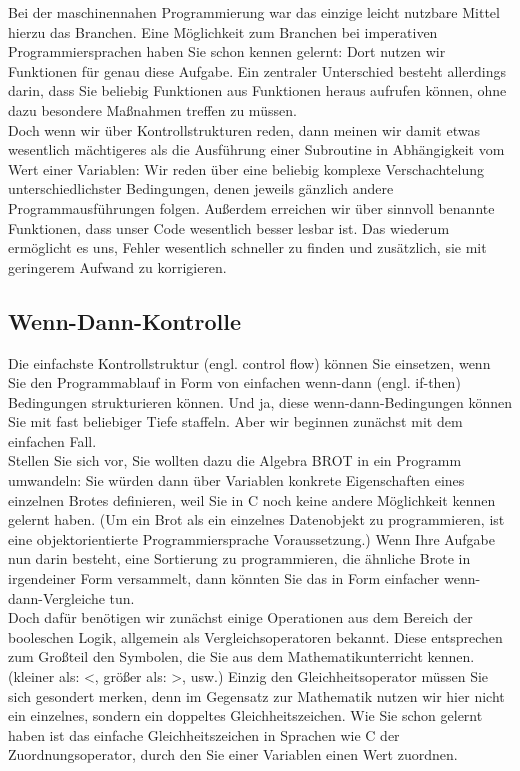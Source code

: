 Bei der maschinennahen Programmierung war das einzige leicht nutzbare Mittel hierzu das Branchen. Eine Möglichkeit zum Branchen bei imperativen Programmiersprachen haben Sie schon kennen gelernt: Dort nutzen wir Funktionen für genau diese Aufgabe. Ein zentraler Unterschied besteht allerdings darin, dass Sie beliebig Funktionen aus Funktionen heraus aufrufen können, ohne dazu besondere Maßnahmen treffen zu müssen. \\

Doch wenn wir über Kontrollstrukturen reden, dann meinen wir damit etwas wesentlich mächtigeres als die Ausführung einer Subroutine in Abhängigkeit vom Wert einer Variablen: Wir reden über eine beliebig komplexe Verschachtelung unterschiedlichster Bedingungen, denen jeweils gänzlich andere Programmausführungen folgen. Außerdem erreichen wir über sinnvoll benannte Funktionen, dass unser Code wesentlich besser lesbar ist. Das wiederum ermöglicht es uns, Fehler wesentlich schneller zu finden und zusätzlich, sie mit geringerem Aufwand zu korrigieren.

\subsection{Wenn-Dann-Kontrolle}

Die einfachste Kontrollstruktur (engl. control flow) können Sie einsetzen, wenn Sie den Programmablauf in Form von einfachen wenn-dann (engl. if-then) Bedingungen strukturieren können. Und ja, diese wenn-dann-Bedingungen können Sie mit fast beliebiger Tiefe staffeln. Aber wir beginnen zunächst mit dem einfachen Fall.\\

Stellen Sie sich vor, Sie wollten dazu die Algebra BROT in ein Programm umwandeln: Sie würden dann über Variablen konkrete Eigenschaften eines einzelnen Brotes definieren, weil Sie in C noch keine andere Möglichkeit kennen gelernt haben. (Um ein Brot als ein einzelnes Datenobjekt zu programmieren, ist eine objektorientierte Programmiersprache Voraussetzung.) Wenn Ihre Aufgabe nun darin besteht, eine Sortierung zu programmieren, die ähnliche Brote in irgendeiner Form versammelt, dann könnten Sie das in Form einfacher wenn-dann-Vergleiche tun.\\

Doch dafür benötigen wir zunächst einige Operationen aus dem Bereich der booleschen Logik, allgemein als Vergleichsoperatoren bekannt. Diese entsprechen zum Großteil den Symbolen, die Sie aus dem Mathematikunterricht kennen. (kleiner als: <, größer als: >, usw.) Einzig den Gleichheitsoperator müssen Sie sich gesondert merken, denn im Gegensatz zur Mathematik nutzen wir hier nicht ein einzelnes, sondern ein doppeltes Gleichheitszeichen. Wie Sie schon gelernt haben ist das einfache Gleichheitszeichen in Sprachen wie C der Zuordnungsoperator, durch den Sie einer Variablen einen Wert zuordnen.\\

